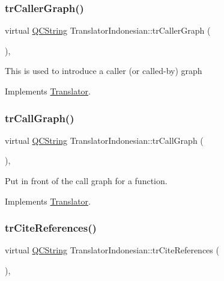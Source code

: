 \subsubsection{\texorpdfstring{trCallerGraph()}{trCallerGraph()}}
{\footnotesize\ttfamily virtual \mbox{\hyperlink{class_q_c_string}{Q\+C\+String}} Translator\+Indonesian\+::tr\+Caller\+Graph (\begin{DoxyParamCaption}{ }\end{DoxyParamCaption})\hspace{0.3cm}{\ttfamily [inline]}, {\ttfamily [virtual]}}

This is used to introduce a caller (or called-\/by) graph 

Implements \mbox{\hyperlink{class_translator}{Translator}}.

\mbox{\label{class_translator_indonesian_a588a9c74b44b41f44369be75533f9a8c}} 
\subsubsection{\texorpdfstring{trCallGraph()}{trCallGraph()}}
{\footnotesize\ttfamily virtual \mbox{\hyperlink{class_q_c_string}{Q\+C\+String}} Translator\+Indonesian\+::tr\+Call\+Graph (\begin{DoxyParamCaption}{ }\end{DoxyParamCaption})\hspace{0.3cm}{\ttfamily [inline]}, {\ttfamily [virtual]}}

Put in front of the call graph for a function. 

Implements \mbox{\hyperlink{class_translator}{Translator}}.

\mbox{\label{class_translator_indonesian_a01b4e8366fc01f5cf4b75209f245317f}} 
\subsubsection{\texorpdfstring{trCiteReferences()}{trCiteReferences()}}
{\footnotesize\ttfamily virtual \mbox{\hyperlink{class_q_c_string}{Q\+C\+String}} Translator\+Indonesian\+::tr\+Cite\+References (\begin{DoxyParamCaption}{ }\end{DoxyParamCaption})\hspace{0.3cm}{\ttfamily [inline]}, {\ttfamily [virtual]}}

